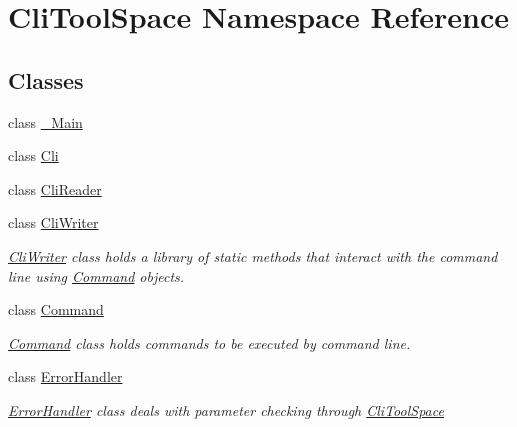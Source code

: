 \hypertarget{namespace_cli_tool_space}{}\section{Cli\+Tool\+Space Namespace Reference}
\label{namespace_cli_tool_space}
\subsection*{Classes}
\begin{DoxyCompactItemize}
\item 
class \mbox{\hyperlink{class_cli_tool_space_1_1___main}{\+\_\+\+Main}}
\item 
class \mbox{\hyperlink{class_cli_tool_space_1_1_cli}{Cli}}
\item 
class \mbox{\hyperlink{class_cli_tool_space_1_1_cli_reader}{Cli\+Reader}}
\item 
class \mbox{\hyperlink{class_cli_tool_space_1_1_cli_writer}{Cli\+Writer}}
\begin{DoxyCompactList}\small\item\em \mbox{\hyperlink{class_cli_tool_space_1_1_cli_writer}{Cli\+Writer}} class holds a library of static methods that interact with the command line using \mbox{\hyperlink{class_cli_tool_space_1_1_command}{Command}} objects. \end{DoxyCompactList}\item 
class \mbox{\hyperlink{class_cli_tool_space_1_1_command}{Command}}
\begin{DoxyCompactList}\small\item\em \mbox{\hyperlink{class_cli_tool_space_1_1_command}{Command}} class holds commands to be executed by command line. \end{DoxyCompactList}\item 
class \mbox{\hyperlink{class_cli_tool_space_1_1_error_handler}{Error\+Handler}}
\begin{DoxyCompactList}\small\item\em \mbox{\hyperlink{class_cli_tool_space_1_1_error_handler}{Error\+Handler}} class deals with parameter checking through \mbox{\hyperlink{namespace_cli_tool_space}{Cli\+Tool\+Space}} \end{DoxyCompactList}\end{DoxyCompactItemize}
